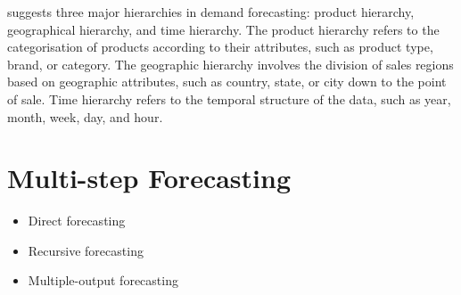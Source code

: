 \cite{vandeput2023demand} suggests three major hierarchies in demand forecasting: product hierarchy, geographical hierarchy, and time hierarchy.
The product hierarchy refers to the categorisation of products according to their attributes, such as product type, brand, or category.
The geographic hierarchy involves the division of sales regions based on geographic attributes, such as country, state, or city down to the point of sale.
Time hierarchy refers to the temporal structure of the data, such as year, month, week, day, and hour.



\section{Multi-step Forecasting}
\label{sec:multi_step_forecasting}
%
\begin{itemize}
    \item Direct forecasting
    \item Recursive forecasting
    \item Multiple-output forecasting
\end{itemize}






